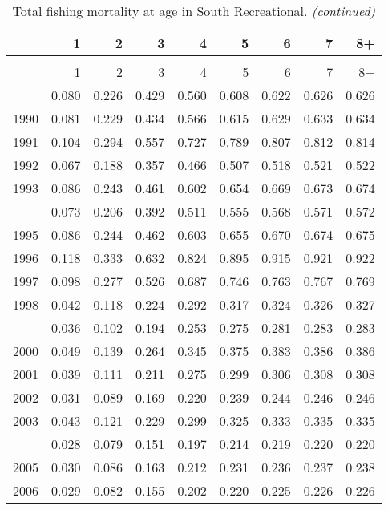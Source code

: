 \documentclass[
]{article}
\begin{document}
\begin{longtable}[t]{lrrrrrrrr}
\caption{\label{tab:South_Recreational-fleet-FAA-table}Total fishing mortality at age in South Recreational.}\\
\toprule
  & 1 & 2 & 3 & 4 & 5 & 6 & 7 & 8+\\
\midrule
\endfirsthead
\caption[]{Total fishing mortality at age in South Recreational. \textit{(continued)}}\\
\toprule
  & 1 & 2 & 3 & 4 & 5 & 6 & 7 & 8+\\
\midrule
\endhead

\endfoot
\bottomrule
\endlastfoot
1989 & 0.080 & 0.226 & 0.429 & 0.560 & 0.608 & 0.622 & 0.626 & 0.626\\
1990 & 0.081 & 0.229 & 0.434 & 0.566 & 0.615 & 0.629 & 0.633 & 0.634\\
1991 & 0.104 & 0.294 & 0.557 & 0.727 & 0.789 & 0.807 & 0.812 & 0.814\\
1992 & 0.067 & 0.188 & 0.357 & 0.466 & 0.507 & 0.518 & 0.521 & 0.522\\
1993 & 0.086 & 0.243 & 0.461 & 0.602 & 0.654 & 0.669 & 0.673 & 0.674\\
\addlinespace
1994 & 0.073 & 0.206 & 0.392 & 0.511 & 0.555 & 0.568 & 0.571 & 0.572\\
1995 & 0.086 & 0.244 & 0.462 & 0.603 & 0.655 & 0.670 & 0.674 & 0.675\\
1996 & 0.118 & 0.333 & 0.632 & 0.824 & 0.895 & 0.915 & 0.921 & 0.922\\
1997 & 0.098 & 0.277 & 0.526 & 0.687 & 0.746 & 0.763 & 0.767 & 0.769\\
1998 & 0.042 & 0.118 & 0.224 & 0.292 & 0.317 & 0.324 & 0.326 & 0.327\\
\addlinespace
1999 & 0.036 & 0.102 & 0.194 & 0.253 & 0.275 & 0.281 & 0.283 & 0.283\\
2000 & 0.049 & 0.139 & 0.264 & 0.345 & 0.375 & 0.383 & 0.386 & 0.386\\
2001 & 0.039 & 0.111 & 0.211 & 0.275 & 0.299 & 0.306 & 0.308 & 0.308\\
2002 & 0.031 & 0.089 & 0.169 & 0.220 & 0.239 & 0.244 & 0.246 & 0.246\\
2003 & 0.043 & 0.121 & 0.229 & 0.299 & 0.325 & 0.333 & 0.335 & 0.335\\
\addlinespace
2004 & 0.028 & 0.079 & 0.151 & 0.197 & 0.214 & 0.219 & 0.220 & 0.220\\
2005 & 0.030 & 0.086 & 0.163 & 0.212 & 0.231 & 0.236 & 0.237 & 0.238\\
2006 & 0.029 & 0.082 & 0.155 & 0.202 & 0.220 & 0.225 & 0.226 & 0.226\\

\end{longtable}
\end{document}
